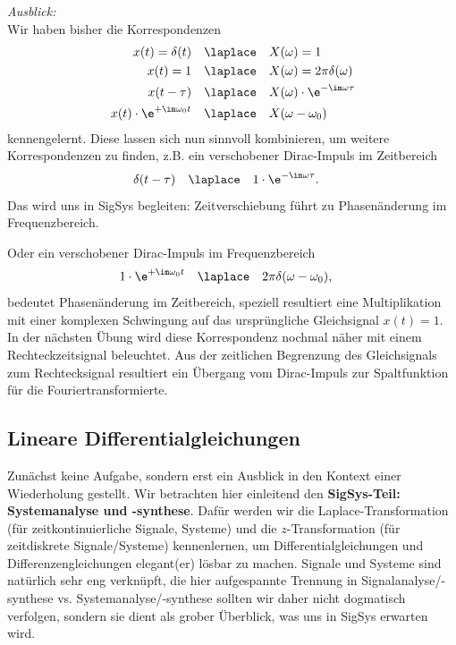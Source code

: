 



\begin{mdframed}
\textit{Ausblick:}
%
\\\noindent
Wir haben bisher die Korrespondenzen
\begin{align}
x(t)= \delta(t) &\quad \laplace \quad X(\omega)=1\\
x(t)= 1 &\quad \laplace \quad X(\omega)=2\pi \delta(\omega)\\
x(t - \tau) & \quad \laplace \quad X(\omega) \cdot \e^{-\im\omega \tau}\\
x(t) \cdot \e^{+\im\omega_0 t} & \quad \laplace \quad X(\omega-\omega_0)
\end{align}
kennengelernt.
%
Diese lassen sich nun sinnvoll kombinieren, um weitere Korrespondenzen zu finden,
z.B. ein verschobener Dirac-Impuls im Zeitbereich
\begin{align}
\delta(t-\tau)& \quad \laplace \quad 1 \cdot \e^{-\im\omega \tau}.
\end{align}
Das wird uns in SigSys begleiten: Zeitverschiebung führt zu Phasenänderung im Frequenzbereich.

Oder ein verschobener Dirac-Impuls im Frequenzbereich
\begin{align}
1 \cdot \e^{+\im\omega_0 t} & \quad \laplace \quad 2\pi\delta(\omega-\omega_0),
\end{align}
bedeutet Phasenänderung im Zeitbereich, speziell resultiert eine Multiplikation
mit einer komplexen Schwingung auf das ursprüngliche Gleichsignal $x(t)=1$.
%
In der nächsten Übung wird diese Korrespondenz nochmal näher mit einem
Rechteckzeitsignal beleuchtet. Aus der zeitlichen Begrenzung des Gleichsignals
zum Rechtecksignal resultiert ein Übergang vom Dirac-Impuls zur Spaltfunktion
für die Fouriertransformierte.
\end{mdframed}














\newpage
\subsection{Lineare Differentialgleichungen}
\label{sec:A7BEE9E24E}
%
Zunächst keine Aufgabe, sondern erst ein Ausblick in den Kontext einer Wiederholung
gestellt.
Wir betrachten hier einleitend den \textbf{SigSys-Teil: Systemanalyse und -synthese}.
Dafür werden wir die Laplace-Transformation (für zeitkontinuierliche Signale, Systeme)
und die $z$-Transformation (für zeitdiskrete Signale/Systeme) kennenlernen, um
Differentialgleichungen und Differenzengleichungen elegant(er) lösbar zu machen.
%
Signale und Systeme sind natürlich sehr eng verknüpft, die hier aufgespannte
Trennung in Signalanalyse/-synthese vs. Systemanalyse/-synthese
sollten wir daher nicht dogmatisch verfolgen, sondern sie dient als grober
Überblick, was uns in SigSys erwarten wird.

